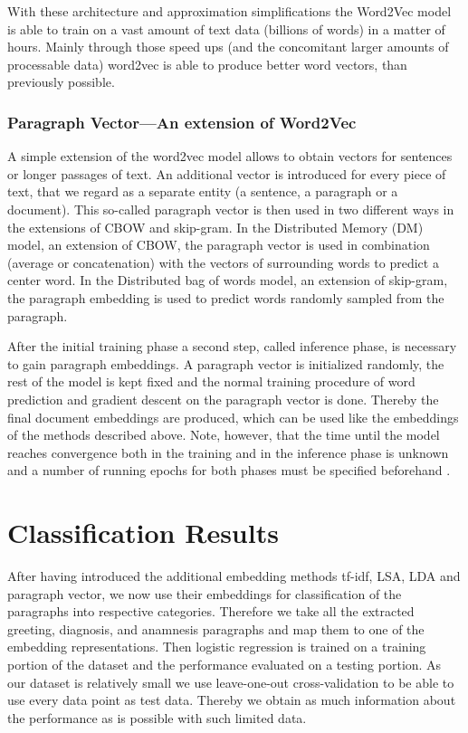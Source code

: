 With these architecture and approximation simplifications the Word2Vec
model is able to train on a vast amount of text data (billions of
words) in a matter of hours. Mainly through those speed ups (and the concomitant larger amounts of processable data) word2vec is able to produce better word vectors, than previously possible.

\subsubsection*{Paragraph Vector---An extension of Word2Vec}

A simple extension of the word2vec model allows to obtain vectors
for sentences or longer passages of text. An additional vector is
introduced for every piece of text, that we regard as a separate entity
(a sentence, a paragraph or a document). This so-called paragraph
vector is then used in two different ways in the extensions of CBOW
and skip-gram. In the Distributed Memory (DM) model, an extension
of CBOW, the paragraph vector is used in combination (average or concatenation)
with the vectors of surrounding words to predict a center word. In
the Distributed bag of words model, an extension of skip-gram, the
paragraph embedding is used to predict words randomly sampled from
the paragraph.

After the initial training phase a second step, called inference phase, is necessary to gain paragraph embeddings. A paragraph vector is initialized randomly, the rest of the model is kept fixed and the normal training procedure of word prediction and gradient descent on the paragraph vector is done. Thereby the final document embeddings are produced, which can be used like the embeddings of the methods described above. Note, however, that the time until the model reaches convergence both in the training and in the inference phase is unknown and a number of running epochs for both phases must be specified beforehand \citep{Le2014}.





\section*{Classification Results}

After having introduced the additional embedding methods tf-idf, LSA, LDA and paragraph vector, we now use their embeddings for classification of the paragraphs into respective categories. Therefore we take all the extracted greeting, diagnosis, and anamnesis paragraphs and map them to one of the embedding representations. Then logistic regression is trained on a training portion of the dataset and the performance evaluated on a testing portion. As our dataset is relatively small we use leave-one-out cross-validation to be able to use every data point as test data. Thereby we obtain as much information about the performance as is possible with such limited data.

